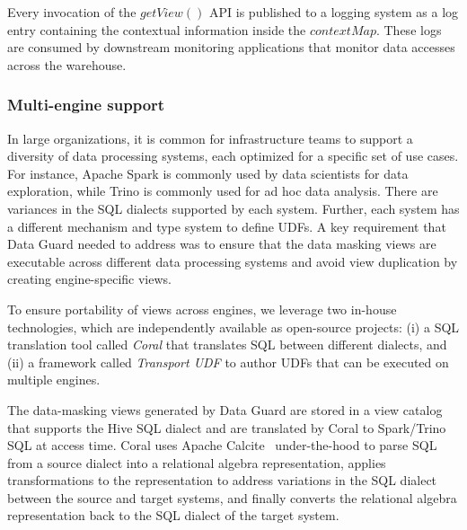Every invocation of the $getView()$ API is published to a logging system as a log entry containing the contextual information inside the $contextMap$. These logs are consumed by downstream monitoring applications that monitor data accesses across the warehouse. 


\subsubsection{Multi-engine support}
In large organizations, it is common for infrastructure teams to support a diversity of data processing systems, each optimized for a specific set of use cases. 
For instance, Apache Spark is commonly used by data scientists for data exploration, while Trino is commonly used for ad hoc data analysis. 
There are variances in the SQL dialects supported by each system. Further, each system has a different mechanism and type system to define UDFs. A key requirement that Data Guard needed to address was to ensure that the data masking views are executable across different data processing systems and avoid view duplication by creating engine-specific views. 

To ensure portability of views across engines, we leverage two in-house technologies, which are independently available as open-source projects: (i) a SQL translation tool called \emph{Coral} \cite{coral} that translates SQL between different dialects, and (ii) a framework called \emph{Transport UDF} \cite{transport} to author UDFs that can be executed on multiple engines.

The data-masking views generated by Data Guard are stored in a view catalog that supports the Hive SQL dialect and are translated by Coral to Spark/Trino SQL at access time. Coral uses Apache Calcite~\cite{calcite} under-the-hood to parse SQL from a source dialect into a relational algebra representation, applies transformations to the representation to address variations in the SQL dialect between the source and target systems, and finally converts the relational algebra representation back to the SQL dialect of the target system. 

